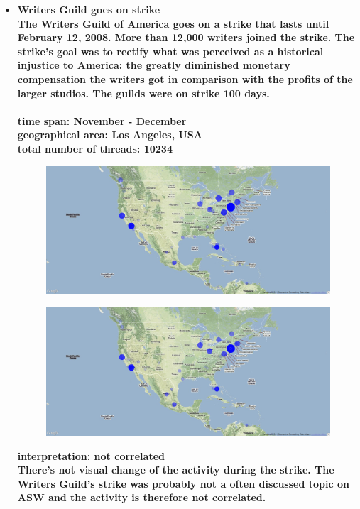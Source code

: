 \documentclass[11pt,a4paper,english]{article}
\begin{document}
\begin{itemize}
						
						
					\item \bf Writers Guild goes on strike \rm
						\\ The Writers Guild of America goes on a strike that lasts until February 12, 2008. More than 12,000 writers joined the strike. The strike's goal was to rectify what was perceived as a historical injustice to America: the greatly diminished monetary compensation the writers got in comparison with the profits of the larger studios. The guilds were on strike 100 days.
						\\\\ \bf time span: \rm November - December
						\\ \bf geographical area: \rm Los Angeles, USA
						\\ \bf total number of threads: \rm 10234
						\begin{figure}[H]
							\vspace{-13pt}
  							\begin{center}
								\includegraphics[width=130mm]{img/pre-writer}
							\end{center}
							\vspace{-13pt}
						\end{figure}
						\begin{figure}[H]
							\vspace{-13pt}
	  						\begin{center}
								\includegraphics[width=130mm]{img/post-writer}
							\end{center}
							\vspace{-13pt}
						\end{figure}	
						\bf interpretation: \rm not correlated
						\\ There's not visual change of the activity during the strike. The Writers Guild's strike was probably not a often discussed topic on ASW and the activity is therefore not correlated.
						
						
						
				\end{itemize}
			
\end{document}
